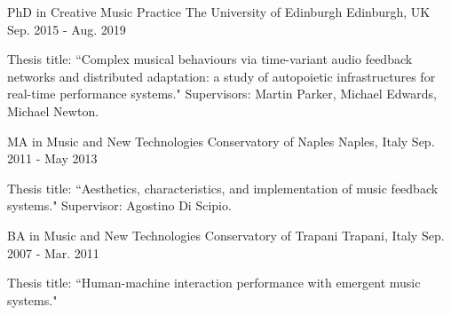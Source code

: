 

\begin{cventries}

  \cventry
    {PhD in Creative Music Practice} %
    {The University of Edinburgh} %
    {Edinburgh, UK} %
    {Sep. 2015 - Aug. 2019} %
    {
      \begin{cvitems} %
        \item {Thesis title: ``Complex
musical behaviours via time-variant audio feedback networks and distributed adaptation: a study
of autopoietic infrastructures for real-time performance systems." Supervisors: Martin Parker,
Michael Edwards, Michael Newton.}
      \end{cvitems}
    }


  \cventry
    {MA in Music and New Technologies} %
    {Conservatory of Naples} %
    {Naples, Italy} %
    {Sep. 2011 - May 2013} %
    {
      \begin{cvitems} %
        \item {Thesis title: ``Aesthetics, characteristics, and implementation of music feedback
systems." Supervisor: Agostino Di Scipio.}
      \end{cvitems}
    }


  \cventry
    {BA in Music and New Technologies} %
    {Conservatory of Trapani} %
    {Trapani, Italy} %
    {Sep. 2007 - Mar. 2011} %
    {
      \begin{cvitems} %
        \item {Thesis title: ``Human-machine interaction performance with emergent music
systems."}
      \end{cvitems}
    }


\end{cventries}
